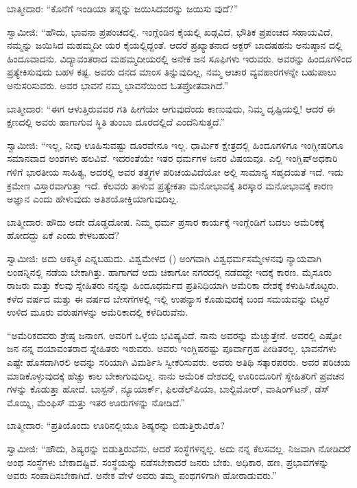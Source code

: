 ಬಾತ್ಮೀದಾರ: “ಕೊನೆಗೆ ಇಂಡಿಯಾ ತನ್ನನ್ನು ಜಯಿಸಿದವರನ್ನು ಜಯಿಸು ವುದೆ?”

ಸ್ವಾಮೀಜಿ: “ಹೌದು, ಭಾವನಾ ಪ್ರಪಂಚದಲ್ಲಿ. ಇಂಗ್ಲೆಂಡಿನ ಕೈಯಲ್ಲಿ ಖಡ್ಗವಿದೆ, ಭೌತಿಕ ಪ್ರಪಂಚದ ಸಹಾಯವಿದೆ, ನಮ್ಮನ್ನು ಜಯಿಸಿದ ಮಹಮ್ಮದೀ ಯರ ಕೈಯಲ್ಲಿದ್ದಂತೆ. ಆದರೆ ಪ್ರಖ್ಯಾತನಾದ ಅಕ್ಟರ್​ ಬಾದಷಹನು ಅನುಷ್ಠಾನ ದಲ್ಲಿ ಹಿಂದೂವಾದನು. ವಿದ್ಯಾವಂತರಾದ ಮಹಮ್ಮದೀಯರಲ್ಲಿ ಅನೇಕ ಜನ ಸೂಫಿಗಳು ಇರುವರು. ಅವರನ್ನು ಹಿಂದೂಗಳಿಂದ ಪ್ರತ್ಯೇಕಿಸುವುದು ಬಹಳ ಕಷ್ಟ. ಅವರು ದನದ ಮಾಂಸ ತಿನ್ನುವುದಿಲ್ಲ, ನಮ್ಮ ಆಚಾರ ವ್ಯವಹಾರಗಳನ್ನೇ ಬಹುಪಾಲು ಅನುಸರಿಸುವರು. ಅವರ ಭಾವನೆ ನಮ್ಮ ಭಾವನೆಯಿಂದ ಓತಪ್ರೋತವಾಗಿದೆ.”

ಬಾತ್ಮೀದಾರ: “ಈಗ ಆಳುತ್ತಿರುವವರ ಗತಿ ಹೀಗೆಯೇ ಆಗುವುದೆಂದು ಕಾಣುವುದು, ನಿಮ್ಮ ದೃಷ್ಟಿಯಲ್ಲಿ! ಆದರೆ ಈ ಕ್ಷಣದಲ್ಲಿ ಅವರು ಹಾಗಾಗುವ ಸ್ಥಿತಿ ತುಂಬಾ ದೂರದಲ್ಲಿದೆ ಎಂದೆನಿಸುತ್ತದೆ.”

ಸ್ವಾಮೀಜಿ: “ಇಲ್ಲ, ನೀವು ಊಹಿಸುವಷ್ಟು ದೂರವೇನೂ ಇಲ್ಲ. ಧಾರ್ಮಿಕ ಕ್ಷೇತ್ರದಲ್ಲಿ ಹಿಂದೂಗಳಿಗೂ ಇಂಗ್ಲೀಷರಿಗೂ ಸಮಾನವಾದ ಅಂಶಗಳು ಹಲವಿವೆ. ಇದರಂತೆಯೇ ಇತರ ಧರ್ಮಗಳ ಜನರ ವಿಷಯವೂ. ಎಲ್ಲಿ ಇಂಗ್ಲಿಷ್​ ಅಧಕಾರಿ ಗಳಿಗೆ ಭಾರತೀಯ ಸಾಹಿತ್ಯ, ಅದರಲ್ಲಿ ಅವರ ತತ್ತ್ವಗಳ ಪರಿಚಯವಿದೆಯೋ ಅಲ್ಲಿ ಸಾಮಾನ್ಯ ಸಹೃದಯತೆ ಇದೆ. ಇದು ಕ್ರಮೇಣ ವಿಸ್ತಾರವಾಗುತ್ತಾ ಇದೆ. ಕೆಲವರು ತಾಳುವ ಪ್ರತ್ಯೇಕತಾ ಮನೋಭಾವಕ್ಕೆ ತಿರಸ್ಕಾರ ಮನೋಭಾವಕ್ಕೆ ಕಾರಣ ಅಜ್ಞಾನ ಎಂದು ಹೇಳುವುದು ಅತಿಶಯೋಕ್ತಿಯಾಗುವುದಿಲ್ಲ.

ಬಾತ್ಮೀದಾರ: ಹೌದು ಅದೇ ದೊಡ್ಡದೋಷ. ನಿಮ್ಮ ಧರ್ಮ ಪ್ರಸಾರ ಕಾರ್ಯಕ್ಕೆ ಇಂಗ್ಲೆಂಡಿಗೆ ಬದಲು ಅಮೆರಿಕಕ್ಕೆ ಹೋದದ್ದು ಏಕೆ ಎಂದು ಕೇಳಬಹುದೆ?

ಸ್ವಾಮೀಜಿ: ಅದು ಆಕಸ್ಮಿಕ ಎನ್ನಬಹುದು. ವಿಶ್ವಮೇಳದ () ಅಂಗವಾಗಿ ವಿಶ್ವಧರ್ಮಸಮ್ಮೇಳನವು ನ್ಯಾಯವಾಗಿ ಲಂಡನ್ನಿನಲ್ಲಿ ನಡೆಯ ಬೇಕಾಗಿತ್ತು. ಹಾಗಾಗದೆ ಅದು ಚಿಕಾಗೋ ನಗರದಲ್ಲಿ ನಡೆದದ್ದೇ ಇದಕ್ಕೆ ಕಾರಣ. ಮೈಸೂರು ರಾಜರು ಮತ್ತು ಕೆಲವು ಸ್ನೇಹಿತರು ನನ್ನನ್ನು ಹಿಂದೂಧರ್ಮದ ಪ್ರತಿನಿಧಿಯಾಗಿ ಅಮೆರಿಕಾ ದೇಶಕ್ಕೆ ಕಳುಹಿಸಿಕೊಟ್ಟರು. ಕಳೆದ ವರ್ಷದ ಮತ್ತು ಈ ವರ್ಷದ ಬೇಸಗೆಗಳಲ್ಲಿ ಇಲ್ಲಿ ಉಪನ್ಯಾಸ ಕೊಡುವುದಕ್ಕೆ ಬಂದ ಸಮಯವನ್ನು ಬಿಟ್ಟರೆ ಉಳಿದ ಮೂರು ವರುಷಗಳನ್ನು ಅಮೆರಿಕಾದಲ್ಲಿ ಕಳೆದಿರುವೆನು.

“ಅಮೆರಿಕದವರು ಶ್ರೇಷ್ಠ ಜನಾಂಗ. ಅವರಿಗೆ ಒಳ್ಳೆಯ ಭವಿಷ್ಯವಿದೆ. ನಾನು ಅವರನ್ನು ಮೆಚ್ಚುತ್ತೇನೆ. ಅವರಲ್ಲಿ ಎಷ್ಟೋ ಜನ ನನ್ನ ದಯಾವಂತರಾದ ಸ್ನೇಹಿತರು ಇರುವರು. ಅವರು ಇಂಗ್ಲಿಷರಷ್ಟು ಪೂರ್ವಾಗ್ರಹ ಪೀಡಿತರಲ್ಲ. ಭಾವನೆಗಳು ಎಷ್ಟೇ ಹೊಸದಾಗಿರಲಿ ಅವನ್ನು ಸರಿಯಾಗಿ ವಿಮರ್ಶಿಸಿ ಸ್ವೀಕರಿಸುವರು. ಅವರು ಅತಿಥಿ ಸತ್ಕಾರಪರರು. ಅವರ ಪರಿಚಯ ಮಾಡಿಕೊಳ್ಳುವುದಕ್ಕೆ ಹೆಚ್ಚು ಕಾಲ ಬೇಕಾಗುವುದಿಲ್ಲ. ನಾನು ಅಮೆರಿಕ ದೇಶದಲ್ಲಿ ಊರಿಂದೂರಿಗೆ ಸ್ನೇಹಿತರಿಗೆ ಪ್ರವಚನ ಗಳನ್ನು ಕೊಡುತ್ತಾ ಹೋದೆ. ಬಾಸ್ಟನ್​, ನ್ಯೂಯಾರ್ಕ್​, ಫಿಲಡೆಲ್​ಪಿಯಾ, ಬಾಲ್ಟಿಮೋರ್​, ವಾಷಿಂಗ್​ಟನ್​, ಡೆಸ್​ಮೊಯ್ನಿ, ಮೆಂಫಿಸ್​ ಮತ್ತು ಇತರ ಊರುಗಳನ್ನು ನೋಡಿದೆ.”

ಬಾತ್ಮೀದಾರ: “ಪ್ರತಿಯೊಂದು ಊರಿನಲ್ಲಿಯೂ ಶಿಷ್ಯರನ್ನು ಬಿಡುತ್ತಿರುವಿರೊ?

ಸ್ವಾಮೀಜಿ: “ಹೌದು, ಶಿಷ್ಯರನ್ನು ಬಿಡುತ್ತಿರುವೆನು, ಆದರೆ ಸಂಸ್ಥೆಗಳನ್ನಲ್ಲ. ಅದು ನನ್ನ ಕೆಲಸವಲ್ಲ. ನಿಜವಾಗಿ ನೋಡಿದರೆ ಅಂಥ ಸಂಸ್ಥೆಗಳು ಬೇಕಾದಷ್ಟಿವೆ. ಸಂಸ್ಥೆಯನ್ನು ನಡೆಸಬೇಕಾದರೆ ಜನರು ಬೇಕು. ಅಧಿಕಾರ, ಹಣ, ಪ್ರಭಾವಗಳನ್ನು ಅವರು ಸಂಪಾದಿಸಬೇಕಾಗಿದೆ. ಅನೇಕ ವೇಳೆ ಅವರು ತಮ್ಮ ಪಂಥಗಳಿಗಾಗಿ ಹೋರಾಡುವರು.”

